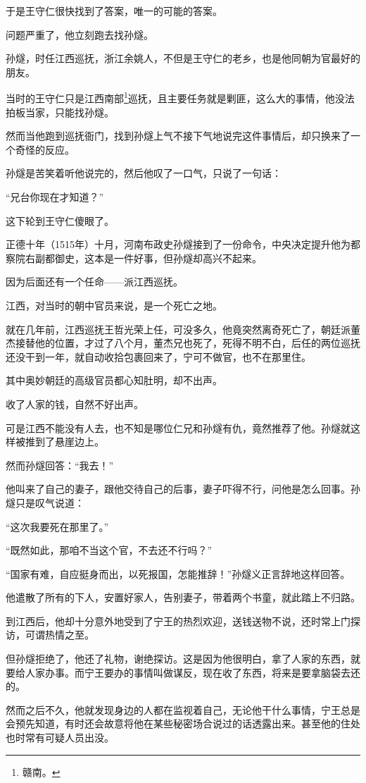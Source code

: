 \begin{multicols}{\theparacolNo}
于是王守仁很快找到了答案，唯一的可能的答案。

问题严重了，他立刻跑去找孙燧。

孙燧，时任江西巡抚，浙江余姚人，不但是王守仁的老乡，也是他同朝为官最好的朋友。

当时的王守仁只是江西南部\footnote{赣南。}巡抚，且主要任务就是剿匪，这么大的事情，他没法拍板当家，只能找孙燧。

然而当他跑到巡抚衙门，找到孙燧上气不接下气地说完这件事情后，却只换来了一个奇怪的反应。

孙燧是苦笑着听他说完的，然后他叹了一口气，只说了一句话：

“兄台你现在才知道？”

这下轮到王守仁傻眼了。

正德十年（1515年）十月，河南布政史孙燧接到了一份命令，中央决定提升他为都察院右副都御史，这本是一件好事，但孙燧却高兴不起来。

因为后面还有一个任命——派江西巡抚。

江西，对当时的朝中官员来说，是一个死亡之地。

就在几年前，江西巡抚王哲光荣上任，可没多久，他竟突然离奇死亡了，朝廷派董杰接替他的位置，才过了八个月，董杰兄也死了，死得不明不白，后任的两位巡抚还没干到一年，就自动收拾包裹回来了，宁可不做官，也不在那里住。

其中奥妙朝廷的高级官员都心知肚明，却不出声。

收了人家的钱，自然不好出声。

可是江西不能没有人去，也不知是哪位仁兄和孙燧有仇，竟然推荐了他。孙燧就这样被推到了悬崖边上。

然而孙燧回答：“我去！”

他叫来了自己的妻子，跟他交待自己的后事，妻子吓得不行，问他是怎么回事。孙燧只是叹气说道：

“这次我要死在那里了。”

“既然如此，那咱不当这个官，不去还不行吗？”

“国家有难，自应挺身而出，以死报国，怎能推辞！”孙燧义正言辞地这样回答。

他遣散了所有的下人，安置好家人，告别妻子，带着两个书童，就此踏上不归路。

到江西后，他却十分意外地受到了宁王的热烈欢迎，送钱送物不说，还时常上门探访，可谓热情之至。

但孙燧拒绝了，他还了礼物，谢绝探访。这是因为他很明白，拿了人家的东西，就要给人家办事。而宁王要办的事情叫做谋反，现在收了东西，将来是要拿脑袋去还的。

然而之后不久，他就发现身边的人都在监视着自己，无论他干什么事情，宁王总是会预先知道，有时还会故意将他在某些秘密场合说过的话透露出来。甚至他的住处也时常有可疑人员出没。


\end{multicols}
